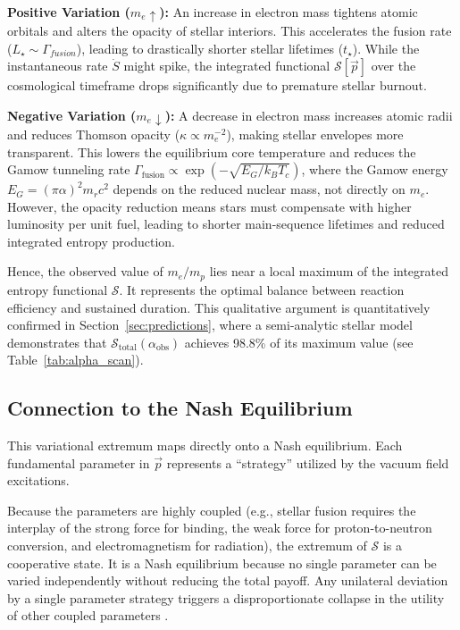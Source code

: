 \documentclass[12pt,a4paper]{article}
\theoremstyle{remark}
\begin{document}
\textbf{Positive Variation ($m_e \uparrow$):} An increase in electron mass tightens atomic orbitals and alters the opacity of stellar interiors. This accelerates the fusion rate ($L_\star \sim \Gamma_{fusion}$), leading to drastically shorter stellar lifetimes ($t_\star$). While the instantaneous rate $\dot{S}$ might spike, the integrated functional $\mathcal{S}[\vec{p}]$ over the cosmological timeframe drops significantly due to premature stellar burnout.

\textbf{Negative Variation ($m_e \downarrow$):} A decrease in electron mass increases atomic radii and reduces Thomson opacity ($\kappa \propto m_e^{-2}$), making stellar envelopes more transparent. This lowers the equilibrium core temperature and reduces the Gamow tunneling rate $\Gamma_{\text{fusion}} \propto \exp(-\sqrt{E_G / k_B T_c})$, where the Gamow energy $E_G = (\pi \alpha)^2 m_r c^2$ depends on the reduced nuclear mass, not directly on $m_e$. However, the opacity reduction means stars must compensate with higher luminosity per unit fuel, leading to shorter main-sequence lifetimes and reduced integrated entropy production.

Hence, the observed value of $m_e/m_p$ lies near a local maximum of the integrated entropy functional $\mathcal{S}$. It represents the optimal balance between reaction efficiency and sustained duration. This qualitative argument is quantitatively confirmed in Section~\ref{sec:predictions}, where a semi-analytic stellar model demonstrates that $\mathcal{S}_{\text{total}}(\alpha_{\text{obs}})$ achieves 98.8\% of its maximum value (see Table~\ref{tab:alpha_scan}).

\subsection{Connection to the Nash Equilibrium}

This variational extremum maps directly onto a Nash equilibrium. Each fundamental parameter in $\vec{p}$ represents a ``strategy'' utilized by the vacuum field excitations.

Because the parameters are highly coupled (e.g., stellar fusion requires the interplay of the strong force for binding, the weak force for proton-to-neutron conversion, and electromagnetism for radiation), the extremum of $\mathcal{S}$ is a cooperative state. It is a Nash equilibrium because no single parameter can be varied independently without reducing the total payoff. Any unilateral deviation by a single parameter strategy triggers a disproportionate collapse in the utility of other coupled parameters \citep{Adams2019}.
\end{document}

